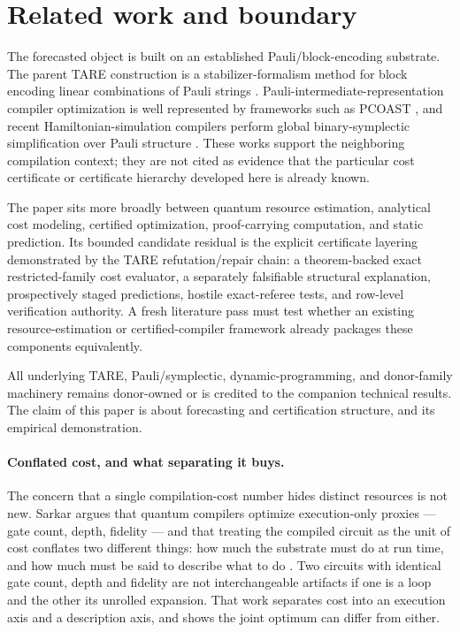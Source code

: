 \section{Related work and boundary}

The forecasted object is built on an established Pauli/block-encoding substrate. The parent TARE construction is a stabilizer-formalism method for block encoding linear combinations of Pauli strings \cite{schillo2026blockencoding}. Pauli-intermediate-representation compiler optimization is well represented by frameworks such as PCOAST \cite{paykin2023pcoast}, and recent Hamiltonian-simulation compilers perform global binary-symplectic simplification over Pauli structure \cite{yang2026symphony}. These works support the neighboring compilation context; they are not cited as evidence that the particular cost certificate or certificate hierarchy developed here is already known.

The paper sits more broadly between quantum resource estimation, analytical cost modeling, certified optimization, proof-carrying computation, and static prediction. Its bounded candidate residual is the explicit certificate layering demonstrated by the TARE refutation/repair chain: a theorem-backed exact restricted-family cost evaluator, a separately falsifiable structural explanation, prospectively staged predictions, hostile exact-referee tests, and row-level verification authority. A fresh literature pass must test whether an existing resource-estimation or certified-compiler framework already packages these components equivalently.

All underlying TARE, Pauli/symplectic, dynamic-programming, and donor-family machinery remains donor-owned or is credited to the companion technical results. The claim of this paper is about forecasting and certification structure, and its empirical demonstration.

\paragraph{Conflated cost, and what separating it buys.}
The concern that a single compilation-cost number hides distinct resources is not new. Sarkar argues that quantum compilers optimize execution-only proxies --- gate count, depth, fidelity --- and that treating the compiled circuit as the unit of cost conflates two different things: how much the substrate must do at run time, and how much must be said to describe what to do \cite{sarkar2026decomp2}. Two circuits with identical gate count, depth and fidelity are not interchangeable artifacts if one is a loop and the other its unrolled expansion. That work separates cost into an execution axis and a description axis, and shows the joint optimum can differ from either.

